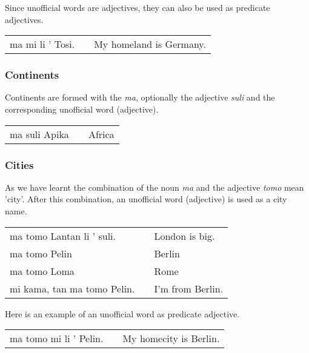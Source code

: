 Since unofficial words are adjectives, they can also be used as predicate adjectives.

\begin{supertabular}{p{5,5cm}|ll}
ma mi li ' Tosi. && My homeland is Germany.  \\
\end{supertabular}

%
\subsubsection*{Continents}
%
Continents are formed with the \textit{ma}, optionally the adjective \textit{suli} and the corresponding unofficial word (adjective). 

\begin{supertabular}{p{2,5cm}|ll}
ma suli Apika && Africa \\
\end{supertabular}

%
\subsubsection*{Cities}
%
As we have learnt the combination of the noun \textit{ma} and the adjective \textit{tomo} mean 'city'.
After this combination, an unofficial word (adjective) is used as a city name. 

\begin{supertabular}{p{5,5cm}|ll}
ma tomo Lantan li ' suli. && London is big. \\
ma tomo Pelin && Berlin \\
ma tomo Loma && Rome \\
mi kama, tan ma tomo Pelin. && I'm from Berlin. \\
\end{supertabular} 

Here is an example of an unofficial word as predicate adjective.

\begin{supertabular}{p{5,5cm}|ll}
ma tomo mi li ' Pelin. && My homecity is Berlin.  \\
\end{supertabular}

